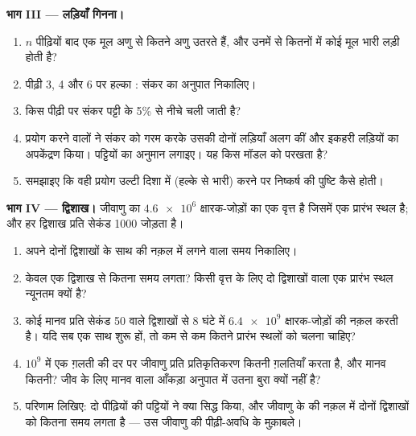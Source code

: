 \begin{problem}
\medskip
\noindent\textbf{भाग III --- लड़ियाँ गिनना।}
\begin{enumerate}[resume]
  \item $n$ पीढ़ियों बाद एक मूल अणु से कितने  अणु उतरते हैं, और उनमें
        से कितनों में कोई मूल भारी लड़ी होती है?
  \item पीढ़ी 3, 4 और 6 पर हल्का : संकर का अनुपात निकालिए।
  \item किस पीढ़ी पर संकर पट्टी  के 5\% से नीचे चली जाती है?
  \item प्रयोग करने वालों ने संकर  को गरम करके उसकी दोनों लड़ियाँ अलग
        कीं और इकहरी लड़ियों का अपकेंद्रण किया। पट्टियों का अनुमान
        लगाइए। यह किस मॉडल को परखता है?
  \item समझाइए कि वही प्रयोग उल्टी दिशा में (हल्के से भारी) करने पर
        निष्कर्ष की पुष्टि कैसे होती।
\end{enumerate}

\medskip
\noindent\textbf{भाग IV --- द्विशाख।}
जीवाणु का  $\num{4.6e6}$ क्षारक-जोड़ों का एक वृत्त है जिसमें एक
प्रारंभ स्थल है; और हर द्विशाख प्रति सेकंड 1000  जोड़ता है।
\begin{enumerate}[resume]
  \item अपने दोनों द्विशाखों के साथ  की नक़ल में लगने वाला समय
        निकालिए।
  \item केवल एक द्विशाख से कितना समय लगता? किसी वृत्त के लिए दो
        द्विशाखों वाला एक प्रारंभ स्थल न्यूनतम क्यों है?
  \item कोई मानव  प्रति सेकंड 50  वाले द्विशाखों से 8
        घंटे में $\num{6.4e9}$ क्षारक-जोड़ों की नक़ल करती है। यदि सब एक
        साथ शुरू हों, तो कम से कम कितने प्रारंभ स्थलों को चलना चाहिए?
  \item $10^9$  में एक ग़लती की दर पर जीवाणु प्रति
        प्रतिकृतिकरण कितनी ग़लतियाँ करता है, और मानव  कितनी? जीव के
        लिए मानव वाला आँकड़ा अनुपात में उतना बुरा क्यों नहीं है?
  \item परिणाम लिखिए: दो पीढ़ियों की पट्टियों ने क्या सिद्ध किया, और
        जीवाणु के  की नक़ल में दोनों द्विशाखों को कितना समय लगता
        है --- उस जीवाणु की पीढ़ी-अवधि के मुक़ाबले।
\end{enumerate}
\end{problem}
